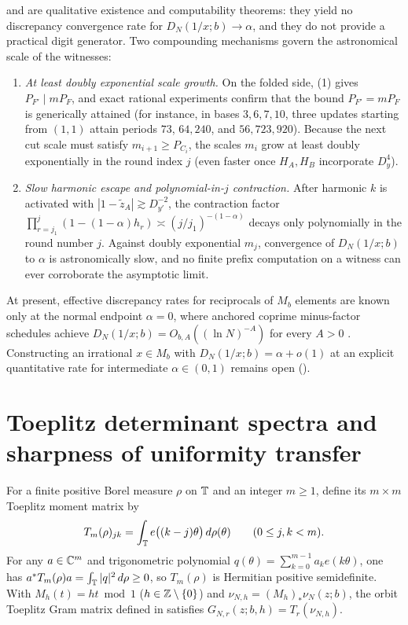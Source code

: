 \documentclass[11pt]{article}
\begin{document}
\begin{remark}\label{rem:ineffective}
 and  are qualitative existence and computability theorems: they yield no discrepancy convergence rate for $D_N(1/x;b)\to\alpha$, and they do not provide a practical digit generator. Two compounding mechanisms govern the astronomical scale of the witnesses:
\begin{enumerate}[label=\textup{(\arabic*)},nosep]
\item \emph{At least doubly exponential scale growth.} On the folded side, (1) gives $P_{F'}\mid mP_F$, and exact rational experiments confirm that the bound $P_{F'}=mP_F$ is generically attained (for instance, in bases $3,6,7,10$, three updates starting from $(1,1)$ attain periods $73$, $64{,}240$, and $56{,}723{,}920$). Because the next cut scale must satisfy $m_{i+1}\ge P_{C_i}$, the scales $m_i$ grow at least doubly exponentially in the round index $j$ (even faster once $H_A,H_B$ incorporate $D_y^4$).
\item \emph{Slow harmonic escape and polynomial-in-$j$ contraction.} After harmonic $k$ is activated with $|1-\widetilde z_A|\gtrsim D_{y'}^{-2}$, the contraction factor $\prod_{r=j_1}^j(1-(1-\alpha)h_r)\asymp(j/j_1)^{-(1-\alpha)}$ decays only polynomially in the round number $j$. Against doubly exponential $m_j$, convergence of $D_N(1/x;b)$ to $\alpha$ is astronomically slow, and no finite prefix computation on a witness can ever corroborate the asymptotic limit.
\end{enumerate}
At present, effective discrepancy rates for reciprocals of $M_b$ elements are known only at the normal endpoint $\alpha=0$, where anchored coprime minus-factor schedules achieve $D_N(1/x;b)=O_{b,A}((\ln N)^{-A})$ for every $A>0$ \cite{PaperXIII}. Constructing an irrational $x\in M_b$ with $D_N(1/x;b)=\alpha+o(1)$ at an explicit quantitative rate for intermediate $\alpha\in(0,1)$ remains open ().
\end{remark}

\section{Toeplitz determinant spectra and sharpness of uniformity transfer}\label{sec:toeplitz}

For a finite positive Borel measure $\rho$ on $\mathbb T$ and an integer $m\ge1$, define its $m\times m$ Toeplitz moment matrix by
\[
T_m(\rho)_{jk}=\int_{\mathbb T}e\bigl((k-j)\theta\bigr)\,d\rho(\theta)\qquad(0\le j,k<m).
\]
For any $a\in\mathbb C^m$ and trigonometric polynomial $q(\theta)=\sum_{k=0}^{m-1}a_ke(k\theta)$, one has $a^*T_m(\rho)a=\int_{\mathbb T}|q|^2\,d\rho\ge0$, so $T_m(\rho)$ is Hermitian positive semidefinite. With $M_h(t)=ht\bmod1$ ($h\in\mathbb Z\setminus\{0\}$) and $\nu_{N,h}=(M_h)_*\nu_N(z;b)$, the orbit Toeplitz Gram matrix defined in  satisfies $G_{N,r}(z;b,h)=T_r(\nu_{N,h})$.
\end{document}
